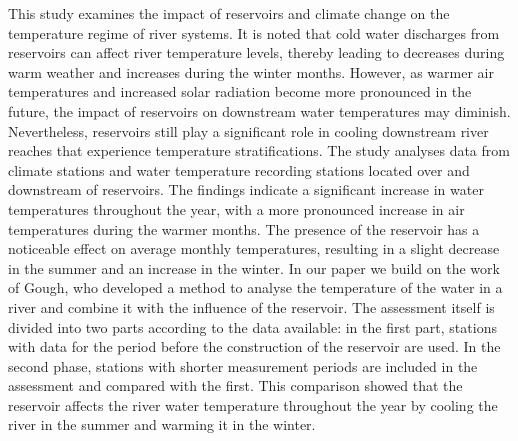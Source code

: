 This study examines the impact of reservoirs and climate change on the temperature regime of river systems. It is noted that cold water discharges from reservoirs can affect river temperature levels, thereby leading to decreases during warm weather and increases during the winter months. However, as warmer air temperatures and increased solar radiation become more pronounced in the future, the impact of reservoirs on downstream water temperatures may diminish. Nevertheless, reservoirs still play a significant role in cooling downstream river reaches that experience temperature stratifications. The study analyses data from climate stations and water temperature recording stations located over and downstream of reservoirs. The findings indicate a significant increase in water temperatures throughout the year, with a more pronounced increase in air temperatures during the warmer months. The presence of the reservoir has a noticeable effect on average monthly temperatures, resulting in a slight decrease in the summer and an increase in the winter. In our paper we build on the work of Gough, who developed a method to analyse the temperature of the water in a river and combine it with the influence of the reservoir. The assessment itself is divided into two parts according to the data available: in the first part, stations with data for the period before the construction of the reservoir are used. In the second phase, stations with shorter measurement periods are included in the assessment and compared with the first. This comparison showed that the reservoir affects the river water temperature throughout the year by cooling the river in the summer and warming it in the winter.
\newpage{}
{}
\begin{flushleft}







\end{flushleft}


